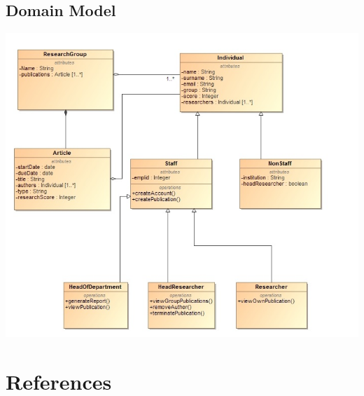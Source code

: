 \documentclass[a4paper,12pt]{article}
\begin{document}
\subsection{Domain Model}
	\includegraphics[width=1\textwidth]{./Domain.jpg}\\[1.5cm]
\newpage
\section{References}
\end{document}
